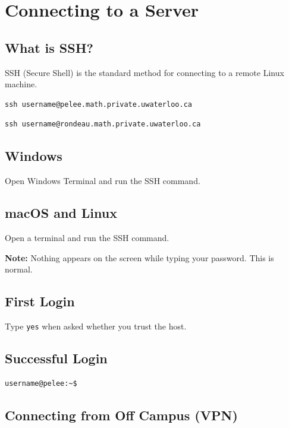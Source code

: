 \section{Connecting to a Server}

\subsection{What is SSH?}

SSH (Secure Shell) is the standard method for connecting to a remote Linux machine.

\begin{lstlisting}
ssh username@pelee.math.private.uwaterloo.ca
\end{lstlisting}

\begin{lstlisting}
ssh username@rondeau.math.private.uwaterloo.ca
\end{lstlisting}

\subsection{Windows}
Open Windows Terminal and run the SSH command.

\subsection{macOS and Linux}
Open a terminal and run the SSH command.

\textbf{Note:} Nothing appears on the screen while typing your password. This is normal.

\subsection{First Login}

Type \texttt{yes} when asked whether you trust the host.

\subsection{Successful Login}

\begin{lstlisting}
username@pelee:~$
\end{lstlisting}

\subsection{Connecting from Off Campus (VPN)}

